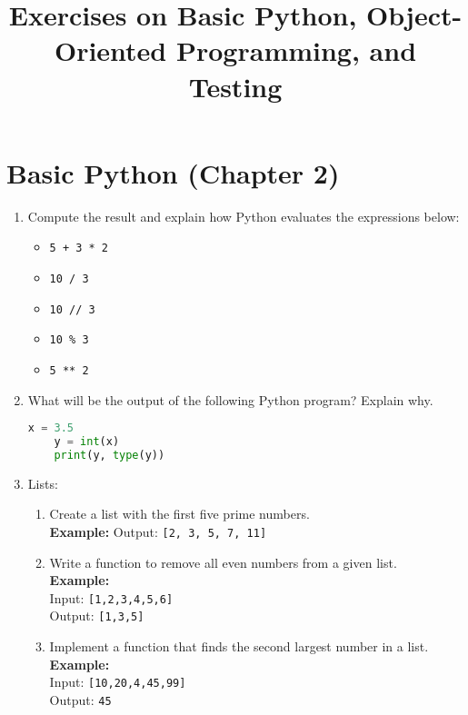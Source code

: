\documentclass{article}
\title{Exercises on Basic Python, Object-Oriented Programming, and Testing}
\author{}
\date{}
\begin{document}
\maketitle

\section*{Basic Python (Chapter 2)}

\begin{enumerate}
    \item Compute the result and explain how Python evaluates the expressions below:
    \begin{itemize}
        \item \texttt{5 + 3 * 2}
        \item \texttt{10 / 3}
        \item \texttt{10 // 3}
        \item \texttt{10 \% 3}
        \item \texttt{5 ** 2}
    \end{itemize}
    
    \item What will be the output of the following Python program? Explain why.
    
    \begin{lstlisting}[language=Python]
    x = 3.5
    y = int(x)
    print(y, type(y))
    \end{lstlisting}
    
    \item Lists:

    \begin{enumerate}
        \item Create a list with the first five prime numbers.\\
        \textbf{Example:} Output: \texttt{[2, 3, 5, 7, 11]}
        
        \item Write a function to remove all even numbers from a given list.\\
        \textbf{Example:} \\
        Input: \texttt{[1,2,3,4,5,6]} \\
        Output: \texttt{[1,3,5]}
        
        \item Implement a function that finds the second largest number in a list.\\
        \textbf{Example:} \\
        Input: \texttt{[10,20,4,45,99]} \\
        Output: \texttt{45}
        

\end{enumerate}
\end{enumerate}
\end{document}
